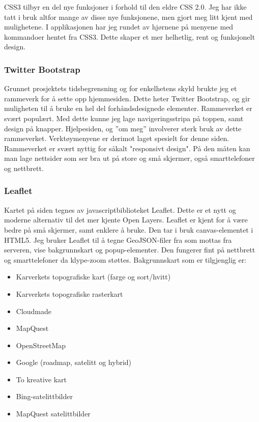 \documentclass[12pt,twoside,onecolumn]{article}
\begin{document}
		CSS3 tilbyr en del nye funksjoner i forhold til den eldre CSS 2.0. Jeg har ikke tatt i bruk altfor mange av disse nye funksjonene, men gjort meg litt kjent med mulighetene. I applikasjonen har jeg rundet av hjørnene på menyene med kommandoer hentet fra CSS3. Dette skaper et mer helhetlig, rent og funksjonelt design. 
	
		\subsubsection{Twitter Bootstrap\cite{bootstrap}}
			
			Grunnet prosjektets tidsbegrensning og for enkelhetens skyld brukte jeg et rammeverk for å sette opp hjemmesiden. Dette heter Twitter Bootstrap, og gir muligheten til å bruke en hel del forhåndsdesignede elementer. Rammeverket er svært populært. Med dette kunne jeg lage navigeringsstripa på toppen, samt design på knapper. Hjelpesiden, og ''om meg'' involverer sterk bruk av dette rammeverket. Verktøymenyene er derimot laget spesielt for denne siden. Rammeverket er svært nyttig for såkalt "responsivt design". På den måten kan man lage nettsider som ser bra ut på store og små skjermer, også smarttelefoner og nettbrett. 
			
		\subsubsection{Leaflet\cite{leaflet}}
		
			Kartet på siden tegnes av javascriptbiblioteket Leaflet. Dette er et nytt og moderne alternativ til det mer kjente Open Layers. Leaflet er kjent for å være bedre på små skjermer, samt enklere å bruke. Den tar i bruk canvas-elementet i HTML5. Jeg bruker Leaflet til å tegne GeoJSON-filer fra som mottas fra serveren, vise bakgrunnskart og popup-elementer. Den fungerer fint på nettbrett og smarttelefoner da klype-zoom støttes. Bakgrunnskart som er tilgjenglig er:
			
			\begin{itemize}
				\item Karverkets topografiske kart (farge og sort/hvitt)
				\item Karverkets topografiske rasterkart
				\item Cloudmade
				\item MapQuest
				\item OpenStreetMap
				\item Google (roadmap, satelitt og hybrid)
				\item To kreative kart
				\item Bing-satelittbilder
				\item MapQuest satelittbilder
			\end{itemize}
			
\end{document}
